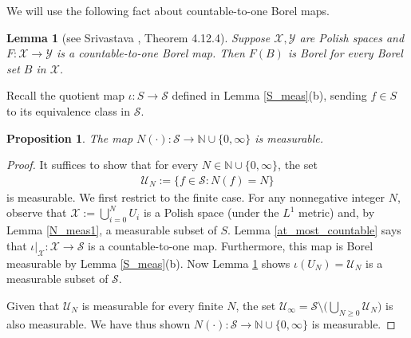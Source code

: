 \documentclass[11pt,reqno]{amsart}
\numberwithin{equation}{section}
\newtheorem{prop}[thm]{Proposition}
\newtheorem{lemma}[thm]{Lemma}
\theoremstyle{definition}
\begin{document}
We will use the following fact about countable-to-one Borel maps.

\begin{lemma}[see Srivastava \cite{srivastava98}, Theorem 4.12.4] \label{countable_to_one}
Suppose ${\mathcal{X}},{\mathcal{Y}}$ are Polish spaces and $F : {\mathcal{X}} \to {\mathcal{Y}}$ is a countable-to-one Borel map. 
Then $F(B)$ is Borel for every Borel set $B$ in ${\mathcal{X}}$. 
\end{lemma}

Recall the quotient map $\iota : S \to {\mathcal{S}}$ defined in Lemma \ref{S_meas}(b), sending $f \in S$ to its equivalence class in ${\mathcal{S}}$.

\begin{prop} \label{N_meas2}
The map $N(\cdot) : {\mathcal{S}} \to {\mathbb{N}} \cup \{0,\infty\}$ is measurable.
\end{prop}

\begin{proof}
It suffices to show that for every $N \in {\mathbb{N}} \cup \{0,\infty\}$, the set
{\begin{align*} {
{\mathcal{U}}_N := \{f \in {\mathcal{S}} : N(f) = N\}
} \end{align*}}
is measurable.
We first restrict to the finite case.
For any nonnegative integer $N$, observe that ${\mathcal{X}} := \bigcup_{i = 0}^N U_i$ is a Polish space (under the $L^1$ metric) and, by Lemma \ref{N_meas1}, a measurable subset of $S$.
Lemma \ref{at_most_countable} says that $\iota |_{\mathcal{X}} : {\mathcal{X}} \to {\mathcal{S}}$ is a countable-to-one map.
Furthermore, this map is Borel measurable by Lemma \ref{S_meas}(b).
Now Lemma \ref{countable_to_one} shows $\iota(U_N) = {\mathcal{U}}_N$ is a measurable subset of ${\mathcal{S}}$.

Given that ${\mathcal{U}}_N$ is measurable for every finite $N$, the set ${\mathcal{U}}_\infty = {\mathcal{S}} \setminus \big(\bigcup_{N \geq 0} {\mathcal{U}}_N\big)$ is also measurable.
We have thus shown $N(\cdot) : {\mathcal{S}} \to {\mathbb{N}} \cup \{0,\infty\}$ is measurable.
\end{proof}
\end{document}
